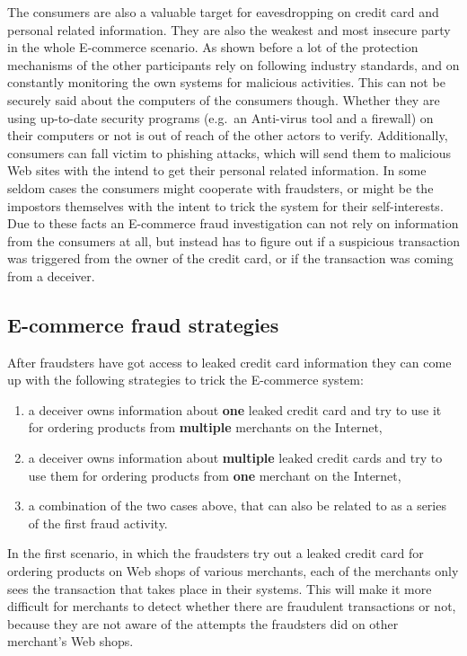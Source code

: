 The consumers are also a valuable target for eavesdropping on credit card and personal related information. They are also the weakest and most insecure party in the whole E-commerce scenario. As shown before a lot of the protection mechanisms of the other participants rely on following industry standards, and on constantly monitoring the own systems for malicious activities. This can not be securely said about the computers of the consumers though. Whether they are using up-to-date security programs (e.g.\ an Anti-virus tool and a firewall) on their computers or not is out of reach of the other actors to verify. Additionally, consumers can fall victim to phishing attacks, which will send them to malicious Web sites with the intend to get their personal related information. In some seldom cases the consumers might cooperate with fraudsters, or might be the impostors themselves with the intent to trick the system for their self-interests. Due to these facts an \gls{E-commerce} fraud investigation can not rely on information from the consumers at all, but instead has to figure out if a suspicious transaction was triggered from the owner of the credit card, or if the transaction was coming from a deceiver.


\subsection{E-commerce fraud strategies}
\label{subsec:strategies_fraudster}

After fraudsters have got access to leaked credit card information they can come up with the following strategies to trick the \gls{E-commerce} system:\@

\begin{enumerate}
  \item a deceiver owns information about \textbf{one} leaked credit card and try to use it for ordering products from \textbf{multiple} merchants on the Internet,
  \item a deceiver owns information about \textbf{multiple} leaked credit cards and try to use them for ordering products from \textbf{one} merchant on the Internet,
  \item a combination of the two cases above, that can also be related to as a series of the first fraud activity.
\end{enumerate}

In the first scenario, in which the fraudsters try out a leaked credit card for ordering products on Web shops of various merchants, each of the merchants only sees the transaction that takes place in their systems. This will make it more difficult for merchants to detect whether there are fraudulent transactions or not, because they are not aware of the attempts the fraudsters did on other merchant's Web shops. \\

